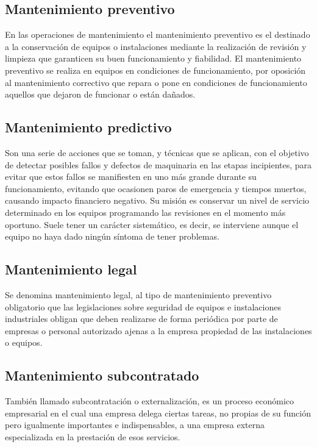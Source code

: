 \documentclass[../main]{subfiles}
\begin{document}
\subsection{Mantenimiento preventivo}
En las operaciones de mantenimiento el mantenimiento preventivo es el destinado a la conservación de equipos o instalaciones mediante la realización de revisión y limpieza que garanticen su buen funcionamiento y fiabilidad. El mantenimiento preventivo se realiza en equipos en condiciones de funcionamiento, por oposición al mantenimiento correctivo que repara o pone en condiciones de funcionamiento aquellos que dejaron de funcionar o están dañados.

\subsection{Mantenimiento predictivo}
Son una serie de acciones que se toman, y técnicas que se aplican, con el objetivo de detectar posibles fallos y defectos de maquinaria en las etapas incipientes, para evitar que estos fallos se manifiesten en uno más grande durante su funcionamiento, evitando que ocasionen paros de emergencia y tiempos muertos, causando impacto financiero negativo. Su misión es conservar un nivel de servicio determinado en los equipos programando las revisiones en el momento más oportuno. Suele tener un carácter sistemático, es decir, se interviene aunque el equipo no haya dado ningún síntoma de tener problemas.

\subsection{Mantenimiento legal}

Se denomina mantenimiento legal, al tipo de mantenimiento preventivo obligatorio que las legislaciones sobre seguridad de equipos e instalaciones industriales obligan que deben realizarse de forma periódica por parte de empresas o personal autorizado ajenas a la empresa propiedad de las instalaciones o equipos. 

\subsection{Mantenimiento subcontratado}
También llamado subcontratación o externalización, es un proceso económico empresarial en el cual una empresa delega ciertas tareas, no propias de su función pero igualmente importantes e indispensables, a una empresa externa especializada en la prestación de esos servicios.
\end{document}
